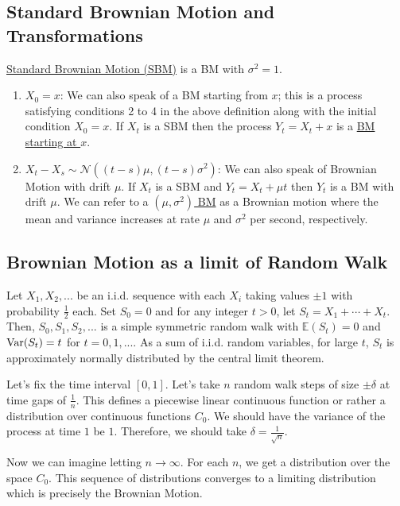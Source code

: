 \documentclass[11pt]{elegantbook}
\begin{document}
\subsection{Standard Brownian Motion and Transformations}
\begin{definition}
    \underline{Standard Brownian Motion (SBM)} is a BM with $\sigma^2 = 1$.
\end{definition}
\begin{claim}[Transformation]
    \begin{enumerate}
        \item $X_0=x$: We can also speak of a BM starting from $x$; this is a process satisfying conditions 2 to 4 in the above definition along with the initial condition $X_0 = x$. If $X_t$ is a SBM then the process $Y_t = X_t +x$ is a \underline{BM starting at $x$}.
        \item $X_t-X_s\sim \mathcal{N}((t-s)\mu, (t-s)\sigma^2)$: We can also speak of Brownian Motion with drift $\mu$. If $X_t$ is a SBM and $Y_t =X_t+\mu t$ then $Y_t$ is a BM with drift $\mu$. We can refer to a \underline{$(\mu,\sigma^2)$ BM} as a Brownian motion where the mean and variance increases at rate $\mu$ and $\sigma^2$ per second, respectively.
    \end{enumerate}
\end{claim}

\subsection{Brownian Motion as a limit of Random Walk}
Let $X_1,X_2,...$ be an i.i.d. sequence with each $X_i$ taking values $\pm 1$ with probability $\frac{1}{2}$ each. Set $S_0 = 0$ and for any integer $t > 0$, let $S_t = X_1 +\cdots+X_t$. Then, $S_0,S_1,S_2,...$ is a simple symmetric random walk with $\mathbb{E}(S_t) = 0$ and $\textnormal{Var}(S_t) = t$ for $t = 0,1,...$. As a sum of i.i.d. random variables, for large $t$, $S_t$ is approximately normally distributed by the central limit theorem.

Let's fix the time interval $[0,1]$. Let's take $n$ random walk steps of size $\pm \delta$ at time gaps of $\frac{1}{n}$. This defines a piecewise linear continuous function or rather a distribution over continuous functions $C_0$. We should have the variance of the process at time $1$ be $1$. Therefore, we should take $\delta=\frac{1}{\sqrt{n}}$.

Now we can imagine letting $n \rightarrow \infty$. For each $n$, we get a distribution over the space $C_0$. This sequence of distributions converges to a limiting distribution which is precisely the Brownian Motion.
\end{document}
